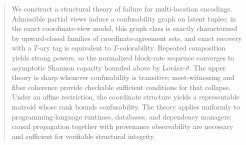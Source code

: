 \begin{abstract}
We construct a structural theory of failure for multi-location encodings. Admissible partial views induce a confusability graph on latent tuples; in the exact coordinate-view model, this graph class is exactly characterized by upward-closed families of coordinate-agreement sets, and exact recovery with a $T$-ary tag is equivalent to $T$-colorability. Repeated composition yields strong powers, so the normalized block-rate sequence converges to asymptotic Shannon capacity bounded above by Lov\'asz-$\vartheta$. The upper theory is sharp whenever confusability is transitive; meet-witnessing and fiber coherence provide checkable sufficient conditions for that collapse. Under an affine restriction, the coordinate structure yields a representable matroid whose rank bounds confusability. The theory applies uniformly to programming-language runtimes, databases, and dependency managers: causal propagation together with provenance observability are necessary and sufficient for verifiable structural integrity.
\end{abstract}
